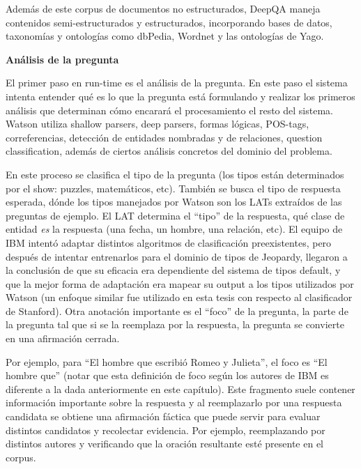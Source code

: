 Además de este corpus de documentos no estructurados, DeepQA maneja
contenidos semi-estructurados  y estructurados, incorporando bases de
datos, taxonomías y ontologías como dbPedia, Wordnet y las
ontologías de Yago.\newline

\textbf{Análisis de la pregunta}\newline

El primer paso en run-time es el análisis de la pregunta. En este paso
el sistema intenta entender qué es lo que la pregunta está
formulando y realizar los primeros análisis que determinan cómo
encarará el procesamiento el resto del sistema. Watson utiliza
shallow parsers, deep parsers, formas lógicas, POS-tags,
correferencias, detección de entidades nombradas y de relaciones,
question classification, además de ciertos análisis concretos del
dominio del problema.

En este proceso se clasifica el tipo de la pregunta (los tipos están
determinados por el show: puzzles, matemáticos, etc). También se
busca el tipo de respuesta esperada, dónde los tipos manejados
por Watson son los LATs extraídos de las preguntas de ejemplo. El LAT
determina el {\textquotedblleft}tipo{\textquotedblright} de la
respuesta, qué clase de entidad \textit{es} la respuesta (una fecha, un
hombre, una relación, etc). El equipo de IBM intentó adaptar
distintos algoritmos de clasificación preexistentes, pero después
de intentar entrenarlos para el dominio de tipos de Jeopardy, llegaron
a la conclusión de que su eficacia era dependiente del  sistema de
tipos default, y que la mejor forma de adaptación era mapear su
output a los tipos utilizados por Watson (un enfoque similar fue
utilizado en esta tesis con respecto al clasificador de Stanford). Otra
anotación importante es el
{\textquotedblleft}foco{\textquotedblright} de la pregunta, la parte de
la pregunta tal que si se la reemplaza por la respuesta, la pregunta se
convierte en una afirmación cerrada.

Por ejemplo, para {\textquotedblleft}El hombre que escribió Romeo y
Julieta{\textquotedblright}, el foco es {\textquotedblleft}El hombre
que{\textquotedblright} (notar que esta definición de foco según los autores de IBM es diferente a la dada anteriormente en este capítulo). Este fragmento suele contener información
importante sobre la respuesta y al reemplazarlo por una respuesta
candidata se obtiene una afirmación fáctica que puede servir para
evaluar distintos candidatos y recolectar evidencia. Por ejemplo,
reemplazando por distintos autores y verificando que la oración
resultante esté presente en el corpus.

